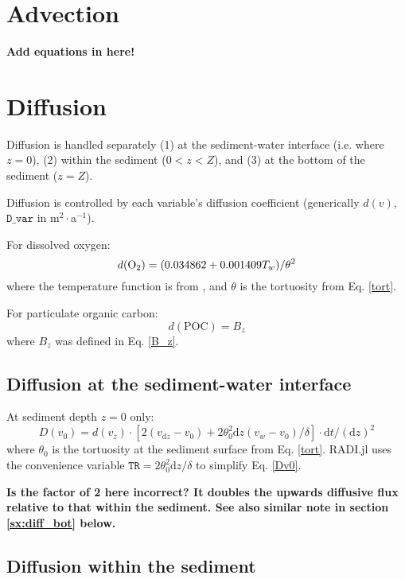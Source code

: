 \documentclass[a4paper]{article}
\newcommand{\D}[1]{\mathrm{d}#1}
\newcommand{\code}[1]{\texttt{#1}}
\newcommand{\wtf}[1]{\textcolor{Cerulean}{\textbf{#1}}}
\begin{document}
\section{Advection}

\wtf{Add equations in here!}

\section{Diffusion}

Diffusion is handled separately (1) at the sediment-water interface (i.e. where $z = 0$), (2) within the sediment ($0 < z < Z$), and (3) at the bottom of the sediment ($z = Z$).

Diffusion is controlled by each variable's diffusion coefficient (generically $d(v)$, $\code{D\_var}$ in m$^2\cdot$a$^{-1}$).

For dissolved oxygen:
\begin{equation}
d(\ce{O2}) = (0.034862 + 0.001409 T_w) / \theta^2
\end{equation}
where the temperature function is from \citet{li_diffusion_1974}, and $\theta$ is the tortuosity from Eq. \eqref{tort}.

For particulate organic carbon:
\begin{equation}
d(\mathrm{POC}) = B_z
\end{equation}
where $B_z$ was defined in Eq. \eqref{B_z}.

\subsection{Diffusion at the sediment-water interface}\label{sx:diff_swi}

At sediment depth $z = 0$ only:
\begin{equation}\label{Dv0}
D(v_0) = d(v_z) \cdot [2 (v_{\D{z}} - v_0) + 2 \theta_0^2 \D{z} (v_w - v_0) / \delta] \cdot \D{t} / (\D{z})^2
\end{equation}
where $\theta_0$ is the tortuosity at the sediment surface from Eq. \eqref{tort}. RADI.jl uses the convenience variable $\code{TR} = 2 \theta_0^2 \D{z} / \delta$ to simplify Eq. \eqref{Dv0}.

\wtf{Is the factor of 2 here incorrect? It doubles the upwards diffusive flux relative to that within the sediment. See also similar note in section \ref{sx:diff_bot} below.}

\subsection{Diffusion within the sediment}
\end{document}
